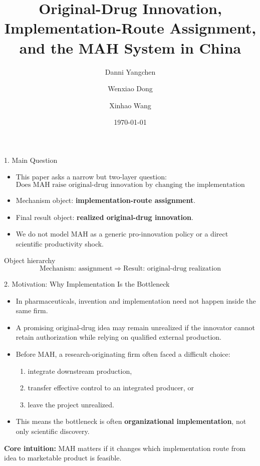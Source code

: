\documentclass[aspectratio=169,11pt]{beamer}
\title[Original-Drug Innovation and MAH]{Original-Drug Innovation, Implementation-Route Assignment,\\ and the MAH System in China}
\author{Danni Yangchen \and Wenxiao Dong \and Xinhao Wang}
\date{\today}
\begin{document}
\begin{frame}
  \titlepage
\end{frame}

\begin{frame}{1. Main Question}
\begin{itemize}
    \item This paper asks a narrow but two-layer question:
    \[
    \text{Does MAH raise original-drug innovation by changing the implementation route from ideas to products?}
    \]
    \item Mechanism object: \textbf{implementation-route assignment}.
    \item Final result object: \textbf{realized original-drug innovation}.
    \item We do not model MAH as a generic pro-innovation policy or a direct scientific productivity shock.
\end{itemize}

\vspace{0.25cm}
\begin{block}{Object hierarchy}
    \[
    \text{Mechanism: assignment} \;\Rightarrow\; \text{Result: original-drug realization}
    \]
\end{block}
\end{frame}

\begin{frame}{2. Motivation: Why Implementation Is the Bottleneck}
\begin{itemize}
    \item In pharmaceuticals, invention and implementation need not happen inside the same firm.
    \item A promising original-drug idea may remain unrealized if the innovator cannot retain authorization while relying on qualified external production.
    \item Before MAH, a research-originating firm often faced a difficult choice:
    \begin{enumerate}
        \item integrate downstream production,
        \item transfer effective control to an integrated producer, or
        \item leave the project unrealized.
    \end{enumerate}
    \item This means the bottleneck is often \textbf{organizational implementation}, not only scientific discovery.
\end{itemize}

\vspace{0.3cm}
\textbf{Core intuition:} MAH matters if it changes which implementation route from idea to marketable product is feasible.
\end{frame}
\end{document}
